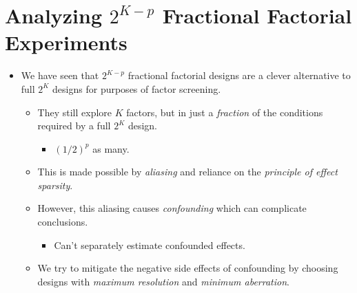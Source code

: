 \section{Analyzing \texorpdfstring{$ 2^{K-p} $}{2K-p} Fractional Factorial Experiments}
\begin{itemize}[*]
    \item We have seen that $2^{K-p}$ fractional factorial designs are a clever alternative to full $2^K$ designs for
          purposes of factor screening.
          \begin{itemize}
              \item They still explore $K$ factors, but in just a \emph{fraction} of the conditions required by a full $2^K$ design.
                    \begin{itemize}[$\hookrightarrow$]
                        \item $ (1/2)^p $ as many.
                    \end{itemize}
              \item This is made possible by \emph{aliasing} and reliance on the \emph{principle of effect sparsity}.
              \item However, this aliasing causes \emph{confounding} which can complicate conclusions.
                    \begin{itemize}[$\hookrightarrow$]
                        \item Can't separately estimate confounded effects.
                    \end{itemize}
              \item We try to mitigate the negative side effects of confounding by choosing designs with \emph{maximum resolution} and \emph{minimum aberration}.
          \end{itemize}
\end{itemize}
